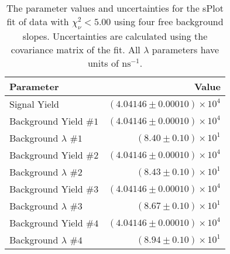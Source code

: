 
\begin{table}[h]
    \begin{center}
        \begin{tabular}{lr}\toprule
            Parameter & Value \\\midrule
            Signal Yield & $(4.04146 \pm 0.00010) \times 10^{4}$ \\
            Background Yield $\#1$ & $(4.04146 \pm 0.00010) \times 10^{4}$ \\
            Background $\lambda$ $\#1$ & $(8.40 \pm 0.10) \times 10^{1}$ \\
            Background Yield $\#2$ & $(4.04146 \pm 0.00010) \times 10^{4}$ \\
            Background $\lambda$ $\#2$ & $(8.43 \pm 0.10) \times 10^{1}$ \\
            Background Yield $\#3$ & $(4.04146 \pm 0.00010) \times 10^{4}$ \\
            Background $\lambda$ $\#3$ & $(8.67 \pm 0.10) \times 10^{1}$ \\
            Background Yield $\#4$ & $(4.04146 \pm 0.00010) \times 10^{4}$ \\
            Background $\lambda$ $\#4$ & $(8.94 \pm 0.10) \times 10^{1}$ \\\bottomrule
        \end{tabular}
        \caption{The parameter values and uncertainties for the sPlot fit of data with $\chi^2_\nu < 5.00$ using four free background slopes. Uncertainties are calculated using the covariance matrix of the fit. All $\lambda$ parameters have units of $\si{\nano\second}^{-1}$.}
    \end{center}
\end{table}
